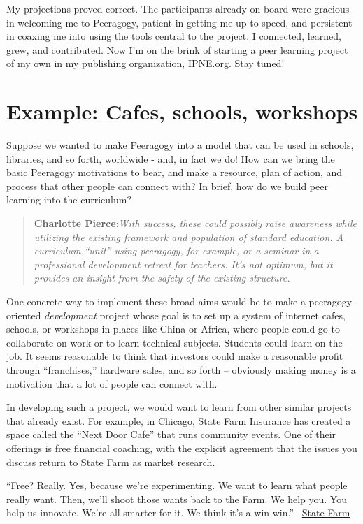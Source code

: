 My projections proved correct. The participants already on board were
gracious in welcoming me to Peeragogy, patient in getting me up to
speed, and persistent in coaxing me into using the tools central to the
project. I connected, learned, grew, and contributed. Now I'm on the
brink of starting a peer learning project of my own in my publishing
organization, IPNE.org. Stay tuned!

\section*{Example: Cafes, schools, workshops}

Suppose we wanted to make Peeragogy into a model that can be used in
schools, libraries, and so forth, worldwide - and, in fact we do! How
can we bring the basic Peeragogy motivations to bear, and make a
resource, plan of action, and process that other people can connect
with? In brief, how do we build peer learning into the curriculum?

\begin{quote}
\textbf{Charlotte Pierce}:\emph{With success, these could possibly raise
awareness while utilizing the existing framework and population of
standard education. A curriculum ``unit'' using peeragogy, for example,
or a seminar in a professional development retreat for teachers. It's
not optimum, but it provides an insight from the safety of the existing
structure.}

\end{quote}
One concrete way to implement these broad aims would be to make a
peeragogy-oriented \emph{development} project whose goal is to set up a
system of internet cafes, schools, or workshops in places like China or
Africa, where people could go to collaborate on work or to learn
technical subjects. Students could learn on the job. It seems reasonable
to think that investors could make a reasonable profit through
``franchises,'' hardware sales, and so forth -- obviously making money
is a motivation that a lot of people can connect with.

In developing such a project, we would want to learn from other similar
projects that already exist. For example, in Chicago, State Farm
Insurance has created a space called the
``\href{https://www.nextdoorchi.com/}{Next Door Cafe}'' that runs
community events. One of their offerings is free financial coaching,
with the explicit agreement that the issues you discuss return to State
Farm as market research.

``Free? Really. Yes, because we're experimenting. We want to learn what
people really want. Then, we'll shoot those wants back to the Farm. We
help you. You help us innovate. We're all smarter for it. We think it's
a win-win.''
--\href{https://www.nextdoorchi.com/web/guest/nd-coaching}{State Farm}

